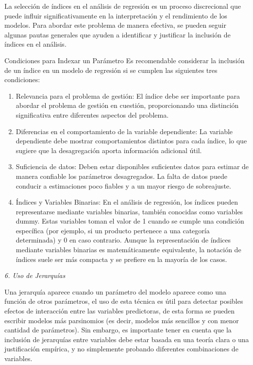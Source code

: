 \documentclass[
]{book}
\begin{document}
La selección de índices en el análisis de regresión es un proceso
discrecional que puede influir significativamente en la interpretación y
el rendimiento de los modelos. Para abordar este problema de manera
efectiva, se pueden seguir algunas pautas generales que ayuden a
identificar y justificar la inclusión de índices en el análisis.

Condiciones para Indexar un Parámetro Es recomendable considerar la
inclusión de un índice en un modelo de regresión si se cumplen las
siguientes tres condiciones:

\begin{enumerate}
\def\labelenumi{\alph{enumi})}
\item
  Relevancia para el problema de gestión: El índice debe ser
  importante para abordar el problema de gestión en cuestión,
  proporcionando una distinción significativa entre diferentes
  aspectos del problema.
\item
  Diferencias en el comportamiento de la variable dependiente: La
  variable dependiente debe mostrar comportamientos distintos para
  cada índice, lo que sugiere que la desagregación aporta información
  adicional útil.
\item
  Suficiencia de datos: Deben estar disponibles suficientes datos para
  estimar de manera confiable los parámetros desagregados. La falta de
  datos puede conducir a estimaciones poco fiables y a un mayor riesgo
  de sobreajuste.
\item
  Índices y Variables Binarias: En el análisis de regresión, los
  índices pueden representarse mediante variables binarias, también
  conocidas como variables dummy. Estas variables toman el valor de 1
  cuando se cumple una condición específica (por ejemplo, si un
  producto pertenece a una categoría determinada) y 0 en caso
  contrario. Aunque la representación de índices mediante variables
  binarias es matemáticamente equivalente, la notación de índices
  suele ser más compacta y se prefiere en la mayoría de los casos.
\end{enumerate}

\emph{6. Uso de Jerarquías}

Una jerarquía aparece cuando un parámetro del modelo aparece como una
función de otros parámetros, el uso de esta técnica es útil para
detectar posibles efectos de interacción entre las variables
predictoras, de esta forma se pueden escribir modelos más parsinomios
(es decir, modelos más sencillos y con menor cantidad de parámetros).
Sin embargo, es importante tener en cuenta que la inclusión de
jerarquías entre variables debe estar basada en una teoría clara o una
justificación empírica, y no simplemente probando diferentes
combinaciones de variables.
\end{document}
